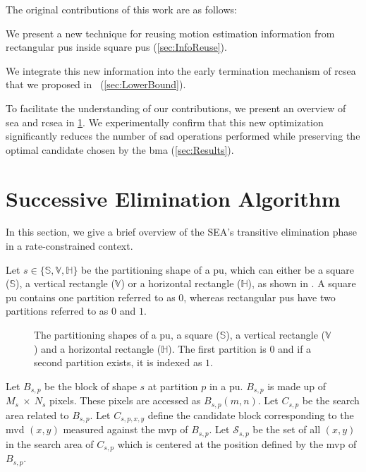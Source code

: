 \documentclass{article}
\begin{document}
The original contributions of this work are as follows:
\begin{compactitem}
\item We present a new technique for reusing motion estimation information from rectangular \glspl{pu} inside square \glspl{pu} (\cref{sec:InfoReuse}).
\item We integrate this new information into the early termination mechanism of \gls{rcsea} that we proposed in~\cite{Trud14} (\cref{sec:LowerBound}).
\end{compactitem}
To facilitate the understanding of our contributions, we present an overview of \gls{sea} and \gls{rcsea} in \cref{sec:SEA}. We experimentally confirm that this new optimization significantly reduces the number of \gls{sad} operations performed while preserving the optimal candidate chosen by the \gls{bma} (\cref{sec:Results}).


\section{Successive Elimination Algorithm}
\label{sec:SEA}
\vspace{-0.5em}

In this section, we give a brief overview of the SEA’s transitive elimination phase in a rate-constrained context. 

Let $s \in \{\mathbb{S}, \mathbb{V}, \mathbb{H}\}$ be the partitioning shape of a \gls{pu}, which can either be a square ($\mathbb{S}$), a vertical rectangle ($\mathbb{V}$) or a horizontal rectangle ($\mathbb{H}$), as shown in . A square \gls{pu} contains one partition referred to as $0$, whereas rectangular \glspl{pu} have two partitions referred to as $0$ and $1$.
\begin{figure}[htb]
\centering

\vspace{-1em}
\caption{\small{The partitioning shapes of a \gls{pu}, a square ($\mathbb{S}$), a vertical rectangle ($\mathbb{V}$) and a horizontal rectangle ($\mathbb{H}$). The first partition is $0$ and if a second partition exists, it is indexed as $1$.}}
\label{fig:CUShapes}
\end{figure}

Let $B_{s,p}$ be the block of shape $s$ at partition $p$ in a \gls{pu}. $B_{s,p}$ is made up of $M_s~\times~N_s$ pixels. These pixels are accessed as $B_{s,p}(m,n)$. Let $C_{s,p}$ be the search area related to $B_{s,p}$. Let $C_{s,p,x,y}$ define the candidate block corresponding to the \gls{mvd} $(x,y)$ measured against the \gls{mvp} of $B_{s,p}$. Let $\mathcal{S}_{s,p}$ be the set of all $(x,y)$ in the search area of $C_{s,p}$ which is centered at the position defined by the \gls{mvp} of $B_{s,p}$.
\end{document}
